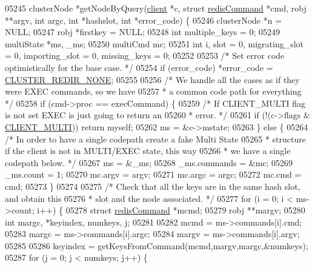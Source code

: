 \begin{DoxyCode}
{{{{{{{{{{{{{{{{{{{{{{{{{{{{{{{{{{{{{{{{{{{{{{{{{{{{{{{{{{{{{{{{{{{{{{{{{{{{{{{{{{{{{{{{{{{{{{{{{{{{{{{{{{{{{05245 clusterNode *getNodeByQuery(\hyperlink{structclient}{client} *c, \textcolor{keyword}{struct} \hyperlink{structredisCommand}{redisCommand} *cmd, robj **argv, \textcolor{keywordtype}{int} 
      argc, \textcolor{keywordtype}{int} *hashslot, \textcolor{keywordtype}{int} *error\_code) \{
05246     clusterNode *n = NULL;
05247     robj *firstkey = NULL;
05248     \textcolor{keywordtype}{int} multiple\_keys = 0;
05249     multiState *ms, \_ms;
05250     multiCmd mc;
05251     \textcolor{keywordtype}{int} i, slot = 0, migrating\_slot = 0, importing\_slot = 0, missing\_keys = 0;
05252 
05253     \textcolor{comment}{/* Set error code optimistically for the base case. */}
05254     \textcolor{keywordflow}{if} (error\_code) *error\_code = \hyperlink{cluster_8h_a5cca5ce77d018a377acdcecf0b443373}{CLUSTER\_REDIR\_NONE};
05255 
05256     \textcolor{comment}{/* We handle all the cases as if they were EXEC commands, so we have}
05257 \textcolor{comment}{     * a common code path for everything */}
05258     \textcolor{keywordflow}{if} (cmd->proc == execCommand) \{
05259         \textcolor{comment}{/* If CLIENT\_MULTI flag is not set EXEC is just going to return an}
05260 \textcolor{comment}{         * error. */}
05261         \textcolor{keywordflow}{if} (!(c->flags & \hyperlink{server_8h_a7f61f783f429419f8c593291a509b03a}{CLIENT\_MULTI})) \textcolor{keywordflow}{return} myself;
05262         ms = &c->mstate;
05263     \} \textcolor{keywordflow}{else} \{
05264         \textcolor{comment}{/* In order to have a single codepath create a fake Multi State}
05265 \textcolor{comment}{         * structure if the client is not in MULTI/EXEC state, this way}
05266 \textcolor{comment}{         * we have a single codepath below. */}
05267         ms = &\_ms;
05268         \_ms.commands = &mc;
05269         \_ms.count = 1;
05270         mc.argv = argv;
05271         mc.argc = argc;
05272         mc.cmd = cmd;
05273     \}
05274 
05275     \textcolor{comment}{/* Check that all the keys are in the same hash slot, and obtain this}
05276 \textcolor{comment}{     * slot and the node associated. */}
05277     \textcolor{keywordflow}{for} (i = 0; i < ms->count; i++) \{
05278         \textcolor{keyword}{struct} \hyperlink{structredisCommand}{redisCommand} *mcmd;
05279         robj **margv;
05280         \textcolor{keywordtype}{int} margc, *keyindex, numkeys, j;
05281 
05282         mcmd = ms->commands[i].cmd;
05283         margc = ms->commands[i].argc;
05284         margv = ms->commands[i].argv;
05285 
05286         keyindex = getKeysFromCommand(mcmd,margv,margc,&numkeys);
05287         \textcolor{keywordflow}{for} (j = 0; j < numkeys; j++) \{
}}}}}}}}}}}}}}}}}}}}}}}}}}}}}}}}}}}}}}}}}}}}}}}}}}}}}}}}}}}}}}}}}}}}}}}}}}}}}}}}}}}}}}}}}}}}}}}}}}}}}}}}}}}}}
\end{DoxyCode}
